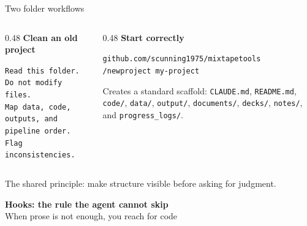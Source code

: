 \documentclass[aspectratio=169,11pt]{beamer}
\begin{document}
\begin{frame}{Two folder workflows}

\begin{columns}[T]
\begin{column}{0.48\textwidth}
\textbf{Clean an old project}

\vspace{0.15cm}
{\footnotesize
\texttt{Read this folder. Do not modify files.}\\
\texttt{Map data, code, outputs, and pipeline order.}\\
\texttt{Flag inconsistencies.}
}
\end{column}

\begin{column}{0.48\textwidth}
\textbf{Start correctly}

\vspace{0.15cm}
{\footnotesize
\texttt{github.com/scunning1975/mixtapetools}\\[0.15cm]
\texttt{/newproject my-project}
}

\vspace{0.1cm}
{\footnotesize Creates a standard scaffold: \texttt{CLAUDE.md}, \texttt{README.md}, \texttt{code/}, \texttt{data/}, \texttt{output/}, \texttt{documents/}, \texttt{decks/}, \texttt{notes/}, and \texttt{progress\_logs/}.}
\end{column}
\end{columns}

\vspace{0.25cm}

\alert{The shared principle: make structure visible before asking for judgment.}

\end{frame}



\begin{frame}[plain]
\vfill
\begin{center}
{\LARGE\bfseries\textcolor{charcoal}{Hooks: the rule the agent cannot skip}}\\[0.35cm]
{\large\textcolor{warmgray}{When prose is not enough, you reach for code}}
\end{center}
\vfill
\end{frame}
\end{document}
